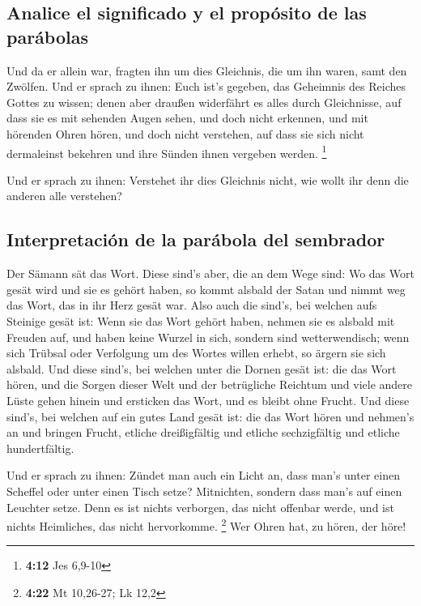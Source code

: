 \hypertarget{analice-el-significado-y-el-propuxf3sito-de-las-paruxe1bolas}{%
\subsection{Analice el significado y el propósito de las
parábolas}\label{analice-el-significado-y-el-propuxf3sito-de-las-paruxe1bolas}}

 Und da er allein war, fragten ihn um dies Gleichnis, die
um ihn waren, samt den Zwölfen.  Und er sprach zu ihnen:
Euch ist's gegeben, das Geheimnis des Reiches Gottes zu wissen; denen
aber draußen widerfährt es alles durch Gleichnisse,  auf
dass sie es mit sehenden Augen sehen, und doch nicht erkennen, und mit
hörenden Ohren hören, und doch nicht verstehen, auf dass sie sich nicht
dermaleinst bekehren und ihre Sünden ihnen vergeben werden. \footnote{\textbf{4:12}
  Jes 6,9-10}

 Und er sprach zu ihnen: Verstehet ihr dies Gleichnis
nicht, wie wollt ihr denn die anderen alle verstehen?

\hypertarget{interpretaciuxf3n-de-la-paruxe1bola-del-sembrador}{%
\subsection{Interpretación de la parábola del
sembrador}\label{interpretaciuxf3n-de-la-paruxe1bola-del-sembrador}}

 Der Sämann sät das Wort.  Diese sind's
aber, die an dem Wege sind: Wo das Wort gesät wird und sie es gehört
haben, so kommt alsbald der Satan und nimmt weg das Wort, das in ihr
Herz gesät war.  Also auch die sind's, bei welchen aufs
Steinige gesät ist: Wenn sie das Wort gehört haben, nehmen sie es
alsbald mit Freuden auf,  und haben keine Wurzel in sich,
sondern sind wetterwendisch; wenn sich Trübsal oder Verfolgung um des
Wortes willen erhebt, so ärgern sie sich alsbald.  Und
diese sind's, bei welchen unter die Dornen gesät ist: die das Wort
hören,  und die Sorgen dieser Welt und der betrügliche
Reichtum und viele andere Lüste gehen hinein und ersticken das Wort, und
es bleibt ohne Frucht.  Und diese sind's, bei welchen auf
ein gutes Land gesät ist: die das Wort hören und nehmen's an und bringen
Frucht, etliche dreißigfältig und etliche sechzigfältig und etliche
hundertfältig.

 Und er sprach zu ihnen: Zündet man auch ein Licht an,
dass man's unter einen Scheffel oder unter einen Tisch setze?
Mitnichten, sondern dass man's auf einen Leuchter setze. 
Denn es ist nichts verborgen, das nicht offenbar werde, und ist nichts
Heimliches, das nicht hervorkomme. \footnote{\textbf{4:22} Mt 10,26-27;
  Lk 12,2}  Wer Ohren hat, zu hören, der höre!


